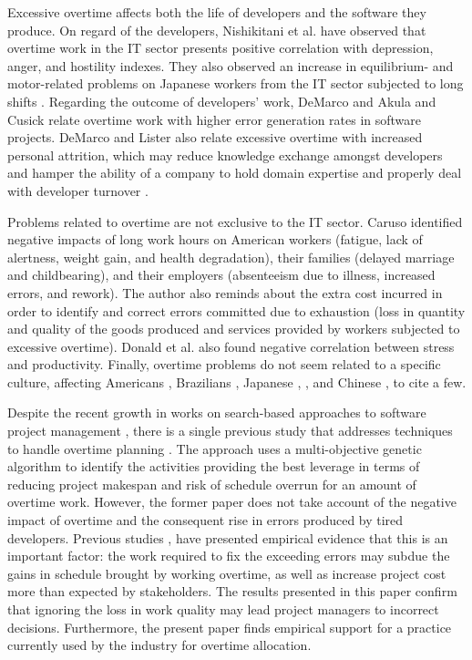 \documentclass[conference]{IEEEtran}
\begin{document}
Excessive overtime affects both the life of developers and the software they produce. On regard of the developers, Nishikitani et al. \cite{NISHIKITANI:2005} have observed that overtime work in the IT sector presents positive correlation with depression, anger, and hostility indexes. They also observed an increase in equilibrium- and motor-related problems on Japanese workers from the IT sector subjected to long shifts \cite{karita:2006}. Regarding the outcome of developers' work, DeMarco \cite{demarco:1982} and Akula and Cusick \cite{akula:2008} relate overtime work with higher error generation rates in software projects. DeMarco and Lister  \cite{demarco:1999} also relate excessive overtime with increased personal attrition, which may reduce knowledge exchange amongst developers  \cite{Andreas:2005} and hamper the ability of a company to hold domain expertise and properly deal with developer turnover \cite{amin:2011}.

Problems related to overtime are not exclusive to the IT sector. Caruso \cite{caruso:2006} identified negative impacts of long work hours on American workers (fatigue, lack of alertness, weight gain, and health degradation), their families (delayed marriage and childbearing), and their employers (absenteeism due to illness, increased errors, and rework). The author also reminds about the extra cost incurred in order to identify and correct errors committed due to exhaustion (loss in quantity and quality of the goods produced and services provided by workers subjected to excessive overtime). Donald et al. \cite{Donald:2005} also found negative correlation between stress and productivity. Finally, overtime problems do not seem related to a specific culture, affecting Americans \cite{caruso:2006}\cite{Dembe:2005}, Brazilians \cite{fischer:2000}, Japanese \cite{karita:2006}, \cite{Sasaki:2007}, and Chinese \cite{Houdmont:2011}, to cite a few.

Despite the recent growth in works on search-based approaches to software project management \cite{ferrucci:2014}, there is a single previous study that addresses techniques to handle overtime planning \cite{Ferrucci:2013}. The approach uses a multi-objective genetic algorithm to identify the activities providing the best leverage in terms of reducing project makespan and risk of schedule overrun for an amount of overtime work. However, the former paper does not take account of the negative impact of overtime and the consequent rise in errors produced by tired developers. Previous studies \cite{demarco:1982}, \cite{akula:2008} have presented empirical evidence that this is an important factor: the work required to fix the exceeding errors may subdue the gains in schedule brought by working overtime, as well as increase project cost more than expected by stakeholders. The results presented in this paper confirm that ignoring the loss in work quality may lead project managers to incorrect decisions. Furthermore, the present paper finds empirical support for a practice currently used by the industry for overtime allocation.
\end{document}
